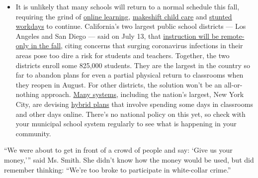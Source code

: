 \begin{itemize}
  \begin{itemize}
  \tightlist
  \item
    It is unlikely that many schools will return to a normal schedule
    this fall, requiring the grind of
    \href{https://www.nytimes.com/2020/06/05/us/coronavirus-education-lost-learning.html?action=click\&pgtype=Article\&state=default\&region=MAIN_CONTENT_3\&context=storylines_faq}{online
    learning},
    \href{https://www.nytimes.com/2020/05/29/us/coronavirus-child-care-centers.html?action=click\&pgtype=Article\&state=default\&region=MAIN_CONTENT_3\&context=storylines_faq}{makeshift
    child care} and
    \href{https://www.nytimes.com/2020/06/03/business/economy/coronavirus-working-women.html?action=click\&pgtype=Article\&state=default\&region=MAIN_CONTENT_3\&context=storylines_faq}{stunted
    workdays} to continue. California's two largest public school
    districts --- Los Angeles and San Diego --- said on July 13, that
    \href{https://www.nytimes.com/2020/07/13/us/lausd-san-diego-school-reopening.html?action=click\&pgtype=Article\&state=default\&region=MAIN_CONTENT_3\&context=storylines_faq}{instruction
    will be remote-only in the fall}, citing concerns that surging
    coronavirus infections in their areas pose too dire a risk for
    students and teachers. Together, the two districts enroll some
    825,000 students. They are the largest in the country so far to
    abandon plans for even a partial physical return to classrooms when
    they reopen in August. For other districts, the solution won't be an
    all-or-nothing approach.
    \href{https://bioethics.jhu.edu/research-and-outreach/projects/eschool-initiative/school-policy-tracker/}{Many
    systems}, including the nation's largest, New York City, are
    devising
    \href{https://www.nytimes.com/2020/06/26/us/coronavirus-schools-reopen-fall.html?action=click\&pgtype=Article\&state=default\&region=MAIN_CONTENT_3\&context=storylines_faq}{hybrid
    plans} that involve spending some days in classrooms and other days
    online. There's no national policy on this yet, so check with your
    municipal school system regularly to see what is happening in your
    community.
  \end{itemize}
\end{itemize}

``We were about to get in front of a crowd of people and say: `Give us
your money,''' said Ms. Smith. She didn't know how the money would be
used, but did remember thinking: ``We're too broke to participate in
white-collar crime.''

